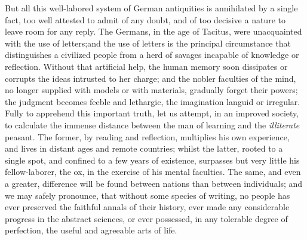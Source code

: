 

But all this well-labored system of German antiquities is
annihilated by a single fact, too well attested to admit of any
doubt, and of too decisive a nature to leave room for any reply.
The Germans, in the age of Tacitus, were unacquainted with the
use of letters;\footnotemark[16] and the use of letters is the principal
circumstance that distinguishes a civilized people from a herd of
savages incapable of knowledge or reflection. Without that
artificial help, the human memory soon dissipates or corrupts the
ideas intrusted to her charge; and the nobler faculties of the
mind, no longer supplied with models or with materials, gradually
forget their powers; the judgment becomes feeble and lethargic,
the imagination languid or irregular. Fully to apprehend this
important truth, let us attempt, in an improved society, to
calculate the immense distance between the man of learning and
the \textit{illiterate} peasant. The former, by reading and reflection,
multiplies his own experience, and lives in distant ages and
remote countries; whilst the latter, rooted to a single spot, and
confined to a few years of existence, surpasses but very little
his fellow-laborer, the ox, in the exercise of his mental
faculties. The same, and even a greater, difference will be found
between nations than between individuals; and we may safely
pronounce, that without some species of writing, no people has
ever preserved the faithful annals of their history, ever made
any considerable progress in the abstract sciences, or ever
possessed, in any tolerable degree of perfection, the useful and
agreeable arts of life.

